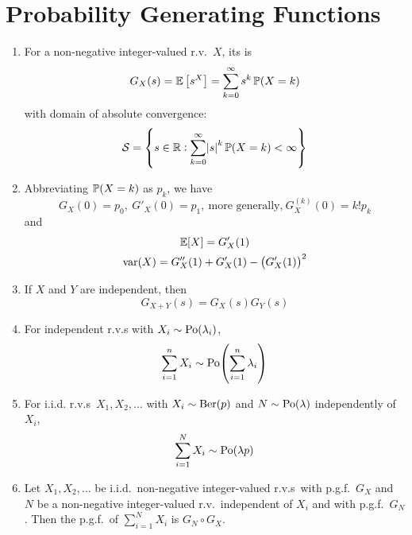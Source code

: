 \documentclass{styles/note}
\begin{document}
\newpage
\section{Probability Generating Functions}
  
  \begin{enumerate}[label=(\alph*)]
    \item For a non-negative integer-valued r.v.~$X$, its  is
      \begin{equation}
        G_X(s) = \operatorname{\mathbb{E}}\big[s^X\big] = \sum_{k=0}^\infty s^k \operatorname{\mathbb{P}}(X = k)
      \end{equation}
      with domain of absolute convergence:
      \[ \mathcal{S} = \set{s \in \mathbb{R}: \sum_{k=0}^\infty \abs{s}^k \operatorname{\mathbb{P}}(X = k) < \infty} \]
    
    \item Abbreviating $\operatorname{\mathbb{P}}(X = k)$ as $p_k$, we have
      \begin{equation}
        G_X(0) = p_0,\ G'_X(0) = p_1, \ \textrm{more generally,} \ G_X^{(k)}(0) = k! p_k
      \end{equation}
      and
      \begin{gather}
        \expectation[X] = G'_X(1) \\
        \variance(X) = G_X''(1) + G_X'(1) - \left(G_X'(1)\right)^2
      \end{gather}
    
    \item If $X$ and $Y$ are independent, then
      \begin{equation}
        G_{X+Y}(s) = G_X(s) G_Y(s)
      \end{equation}
    
    \item For independent r.v.s with $X_i \sim \operatorname{\mathrm{Po}}(\lambda_i)$,
      \begin{equation}
        \sum_{i=1}^n X_i \distributed \poisson\left(\sum_{i=1}^n \lambda_i\right)
      \end{equation}
    
    \item For i.i.d. r.v.s~$X_1, X_2, \dots$ with $X_i \sim \operatorname{\mathrm{Ber}}(p)$ and $N \sim \operatorname{\mathrm{Po}}(\lambda)$ independently of $X_i$,
      \begin{equation}
        \sum_{i=1}^N X_i \sim \operatorname{\mathrm{Po}}(\lambda p)
      \end{equation}
    
    \item Let $X_1, X_2, \dots$ be i.i.d.~non-negative integer-valued r.v.s~with p.g.f.~$G_X$ and $N$ be a non-negative integer-valued r.v.~independent of $X_i$ and with p.g.f.~$G_N$. Then the p.g.f.~of $\sum_{i=1}^N X_i$ is $G_N \circ G_X$.
  \end{enumerate}
\end{document}
